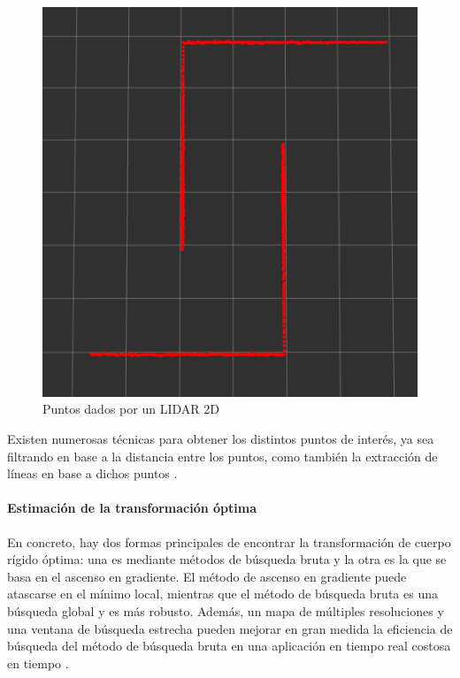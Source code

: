 \begin{figure}[!ht]
    \centering
    \includegraphics[width=0.75\linewidth]{Img/LIDAR2DPoints.png}
    \caption{Puntos dados por un LIDAR 2D}
    \label{fig:lidar2dpoints}
\end{figure}

Existen numerosas técnicas para obtener los distintos puntos de interés, ya sea filtrando en base a la distancia entre los puntos, como también la extracción de líneas en base a dichos puntos \cite{gao2018}.

\paragraph{Estimación de la transformación óptima}
En concreto, hay dos formas principales de encontrar la transformación de cuerpo rígido óptima: una es mediante métodos de búsqueda bruta y la otra es la que se basa en el ascenso en gradiente. El método de ascenso en gradiente puede atascarse en el mínimo local, mientras que el método de búsqueda bruta es una búsqueda global y es más robusto. Además, un mapa de múltiples resoluciones y una ventana de búsqueda estrecha pueden mejorar en gran medida la eficiencia de búsqueda del método de búsqueda bruta en una aplicación en tiempo real costosa en tiempo \cite{olson2009}\cite{olson2015}.

